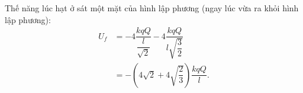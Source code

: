 \begin{loigiai}
\begin{minipage}{0.5\textwidth}
\begin{tikzpicture}[x=0.75pt,y=0.75pt,yscale=-1,xscale=1]
\end{tikzpicture}
 
    \end{minipage}
   \begin{minipage}{0.5\textwidth}
         Thế năng lúc hạt ở sát một mặt của hình lập phương (ngay lúc vừa ra khỏi hình lập phương):
    \begin{equation*}
    \begin{aligned}
         U_{f}&=-4 \dfrac{k q Q}{\dfrac{l}{\sqrt{2}}}-4 \dfrac{k q Q}{l \sqrt{\dfrac{3}{2}}}\\
        &=-\left(4 \sqrt{2}+4 \sqrt{\dfrac{2}{3}}\right) \dfrac{k q Q}{l}.
    \end{aligned}
    \end{equation*}
    \\
   \end{minipage}
   \begin{minipage}{0.5\textwidth}
         


\begin{tikzpicture}[x=0.75pt,y=0.75pt,yscale=-1,xscale=1]


\end{tikzpicture}
\end{minipage}
\end{loigiai}
